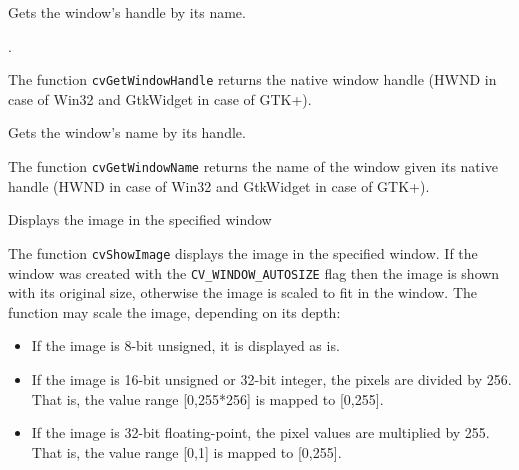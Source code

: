 \ifC
{}

Gets the window's handle by its name.


\begin{description}
.
\end{description}

The function \texttt{cvGetWindowHandle} returns the native window handle (HWND in case of Win32 and GtkWidget in case of GTK+).


Gets the window's name by its handle.


\begin{description}
\end{description}

The function \texttt{cvGetWindowName} returns the name of the window given its native handle (HWND in case of Win32 and GtkWidget in case of GTK+).
\fi


Displays the image in the specified window


\begin{description}
\end{description}

The function \texttt{cvShowImage} displays the image in the specified window. If the window was created with the \texttt{CV\_WINDOW\_AUTOSIZE} flag then the image is shown with its original size, otherwise the image is scaled to fit in the window. The function may scale the image, depending on its depth:
\begin{itemize}
    \item If the image is 8-bit unsigned, it is displayed as is.
    \item If the image is 16-bit unsigned or 32-bit integer, the pixels are divided by 256. That is, the value range [0,255*256] is mapped to [0,255].
    \item If the image is 32-bit floating-point, the pixel values are multiplied by 255. That is, the value range [0,1] is mapped to [0,255].
\end{itemize}

